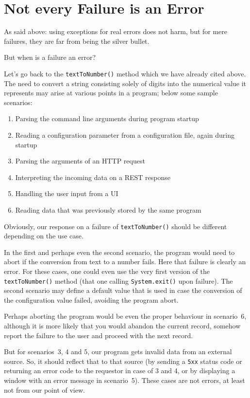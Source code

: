 \section{Not every Failure is an Error}\label{sec:FailureVsError}
As said above: using exceptions for real errors does not harm, but for mere failures, they are far from being the silver bullet.

But when is a failure an error?

Let’s go back to the \lstinline|textToNumber()| method which we have already cited above. The need to convert a string consisting solely of digits into the numerical value it represents may arise at various points in a program; below some sample scenarios:
\begin{enumerate}[label=Scenario \arabic*:,leftmargin=8em]
	\item{Parsing the command line arguments during program startup}
	\item{Reading a configuration parameter from a configuration file, again during startup}
	\item{Parsing the arguments of an HTTP request}
	\item{Interpreting the incoming data on a REST response}
	\item{Handling the user input from a UI}
	\item{Reading data that was previously stored by the same program}
\end{enumerate}

Obviously, our response on a failure of \lstinline|textToNumber()| should be different depending on the use case.

In the first and perhaps even the second scenario, the program would need to abort if the conversion from text to a number fails. Here that failure is clearly an error. For these cases, one could even use the very first version of the \lstinline|textToNumber()| method (that one calling \lstinline|System.exit()| upon failure). The second scenario may define a default value that is used in case the conversion of the configuration value failed, avoiding the program abort.

Perhaps aborting the program would be even the proper behaviour in scenario~6, although it is more likely that you would abandon the current record, somehow report the failure to the user and proceed with the next record.

But for scenarios~3, 4 and 5, our program gets invalid data from an external source. So, it should reflect that to that source (by sending a \texttt{\mbox{5xx}} status code or returning an error code to the requestor in case of 3 and 4, or by displaying a window with an error message in scenario~5). These cases are not errors, at least not from our point of view.

